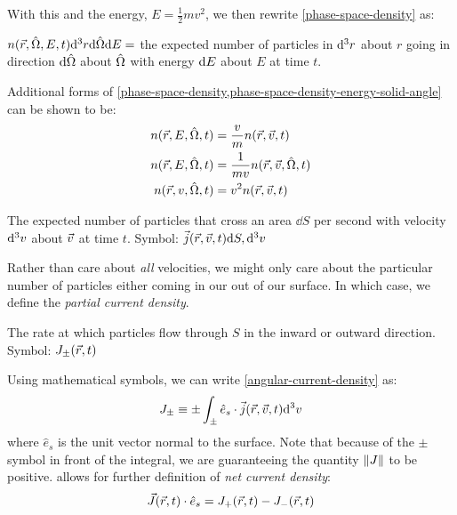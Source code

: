 With this and the energy, $E=\frac{1}{2}mv^2$, we then rewrite \cref{phase-space-density} as:
\begin{definition}\label{phase-space-density-energy-solid-angle}
  $n(\vec{r},\hat{\Omega},E,t)\dd^3 r \dd \hat{\Omega} \dd E = $ the expected number of particles in $\dd^3 r$ about $r$ going in direction $\dd \hat{\Omega}$ about $\hat{\Omega}$ with energy $\dd E$ about $E$ at time $t$.
\end{definition}
Additional forms of \cref{phase-space-density,phase-space-density-energy-solid-angle} can be shown to be:
\begin{equation*}
  \begin{split}
    n(\vec{r},E,\hat{\Omega},t) & = \frac{v}{m}n(\vec{r},\vec{v},t)         \\
    n(\vec{r},E,\hat{\Omega},t) & = \frac{1}{mv}n(\vec{r},\vec{v},\hat{\Omega},t) \\
    n(\vec{r},v,\hat{\Omega},t) & = v^2 n(\vec{r},\vec{v},t)
  \end{split}
\end{equation*}

\begin{definition}
   \label{angular-current-density}
  The expected number of particles that cross an area $\dd S$ per second with velocity $\dd^3 v$ about $\vec{v}$ at time $t$.
  Symbol: $\vec{j}(\vec{r},\vec{v},t)\dd S, \dd^3 v$
\end{definition}
Rather than care about \textit{all} velocities, we might only care about the particular number of particles either coming in our out of our surface.
In which case, we define the \textit{partial current density}.
\begin{definition}
  \label{partial-current-density}
  The rate at which particles flow through $S$ in the inward or outward direction.
  Symbol: $J_{\pm}(\vec{r},t)$
\end{definition}
Using mathematical symbols, we can write \cref{angular-current-density} as:
\begin{equation}
  \label{eq:partial-current-density}
  J_{\pm}\equiv\pm \int_{\pm}\hat{e}_s\cdot \vec{j}(\vec{r},\vec{v},t)  \dd^3 v
\end{equation}
where $\hat{e}_s$ is the unit vector normal to the surface.
Note that because of the $\pm$ symbol in front of the integral, we are guaranteeing the quantity $\norm{J}$ to be positive.
 allows for further definition of \textit{net current density}:
\begin{equation}
  \label{eq:net-current-density}
  \vec{J}(\vec{r},t)\cdot \hat{e}_s=J_+(\vec{r},t)-J_-(\vec{r},t)
\end{equation}

